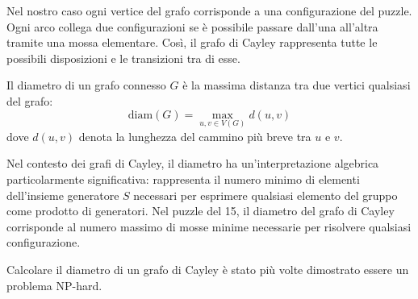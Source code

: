 Nel nostro caso ogni vertice del grafo corrisponde a una configurazione del puzzle.
Ogni arco collega due configurazioni se è possibile passare dall’una all’altra tramite una mossa elementare.
Così, il grafo di Cayley rappresenta tutte le possibili disposizioni e le transizioni tra di esse.

Il diametro di un grafo connesso $G$ è la massima distanza tra due vertici qualsiasi del grafo:
\[
\text{diam}(G) = \max_{u,v \in V(G)} d(u,v)
\]
dove $d(u,v)$ denota la lunghezza del cammino più breve tra $u$ e $v$.

Nel contesto dei grafi di Cayley, il diametro ha un'interpretazione algebrica particolarmente significativa: rappresenta il numero minimo di elementi dell'insieme generatore $S$ necessari per esprimere qualsiasi elemento del gruppo come prodotto di generatori. Nel puzzle del 15, il diametro del grafo di Cayley corrisponde al numero massimo di mosse minime necessarie per risolvere qualsiasi configurazione. 

Calcolare il diametro di un grafo di Cayley è stato più volte dimostrato essere un problema NP-hard. ~\cite{10}
